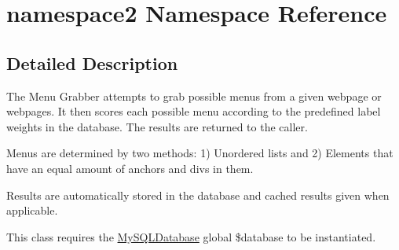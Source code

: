 \hypertarget{namespacenamespace2}{\section{namespace2 Namespace Reference}
\label{namespacenamespace2}
}


\subsection{Detailed Description}
The Menu Grabber attempts to grab possible menus from a given webpage or webpages. It then scores each possible menu according to the predefined label weights in the database. The results are returned to the caller.

Menus are determined by two methods\-: 1) Unordered lists and 2) Elements that have an equal amount of anchors and divs in them.

Results are automatically stored in the database and cached results given when applicable.

This class requires the \hyperlink{classMySQLDatabase}{My\-S\-Q\-L\-Database} global \$database to be instantiated.